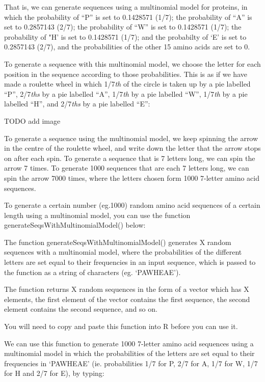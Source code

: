 \documentclass[
]{book}
\begin{document}
That is, we can generate sequences using a multinomial model for proteins, in which the probability of ``P'' is set to 0.1428571 (1/7); the probability of ``A'' is set to 0.2857143 (2/7); the probability of ``W'' is set to 0.1428571 (1/7); the probability of "H' is set to 0.1428571 (1/7); and the probabilty of `E' is set to 0.2857143 (2/7), and the probabilities of the other 15 amino acids are set to 0.

To generate a sequence with this multinomial model, we choose the letter for each position in the sequence according to those probabilities. This is as if we have made a roulette wheel in which 1/7\emph{th} of the circle is taken up by a pie labelled ``P'', 2/7\emph{ths} by a pie labelled ``A'', 1/7\emph{th} by a pie labelled ``W'', 1/7\emph{th} by a pie labelled ``H'', and 2/7\emph{ths} by a pie labelled ``E'':

TODO
add image

To generate a sequence using the multinomial model, we keep spinning the arrow in the centre of the roulette wheel, and write down the letter that the arrow stops on after each spin. To generate a sequence that is 7 letters long, we can spin the arrow 7 times. To generate 1000 sequences that are each 7 letters long, we can spin the arrow 7000 times, where the letters chosen form 1000 7-letter amino acid sequences.

To generate a certain number (eg.1000) random amino acid sequences of a certain length using a multinomial model, you can use the function generateSeqsWithMultinomialModel() below:

The function generateSeqsWithMultinomialModel() generates X random sequences with a multinomial model, where the probabilities of the different letters are set equal to their frequencies in an input sequence, which is passed to the function as a string of characters (eg. `PAWHEAE').

The function returns X random sequences in the form of a vector which has X elements, the first element of the vector contains the first sequence, the second element contains the second sequence, and so on.

You will need to copy and paste this function into R before you can use it.

We can use this function to generate 1000 7-letter amino acid sequences using a multinomial model in which the probabilities of the letters are set equal to their frequencies in `PAWHEAE' (ie. probabilities 1/7 for P, 2/7 for A, 1/7 for W, 1/7 for H and 2/7 for E), by typing:
\end{document}
